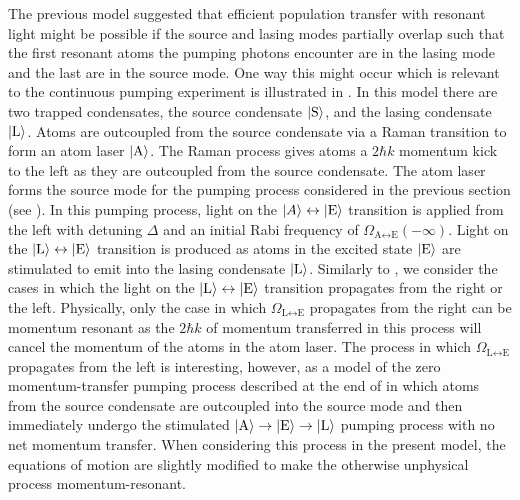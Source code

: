 The previous model suggested that efficient population transfer with resonant light might be possible if the source and lasing modes partially overlap such that the first resonant atoms the pumping photons encounter are in the lasing mode and the last are in the source mode.  One way this might occur which is relevant to the continuous pumping experiment is illustrated in .  In this model there are two trapped condensates, the source condensate ${\left|\text{S}\right>}$, and the lasing condensate ${\left|\text{L}\right>}$.  Atoms are outcoupled from the source condensate via a Raman transition to form an atom laser ${\left|\text{A}\right>}$.  The Raman process gives atoms a $2 \hbar k$ momentum kick to the left as they are outcoupled from the source condensate.  The atom laser forms the source mode for the pumping process considered in the previous section (see ).  In this pumping process, light on the ${\left|A\right>} \leftrightarrow {\ensuremath{\left|\text{E}\right>}}$ transition is applied from the left with detuning $\Delta$ and an initial Rabi frequency of $\Omega_{\text{A}\leftrightarrow\text{E}}(-\infty)$.  Light on the ${\left|\text{L}\right>} \leftrightarrow {\ensuremath{\left|\text{E}\right>}}$ transition is produced as atoms in the excited state ${\left|\text{E}\right>}$ are stimulated to emit into the lasing condensate ${\left|\text{L}\right>}$.  Similarly to , we consider the cases in which the light on the ${\left|\text{L}\right>} \leftrightarrow {\ensuremath{\left|\text{E}\right>}}$ transition propagates from the right or the left.  Physically, only the case in which $\Omega_{\text{L}\leftrightarrow\text{E}}$ propagates from the right can be momentum resonant as the $2 \hbar k$ of momentum transferred in this process will cancel the momentum of the atoms in the atom laser.  The process in which $\Omega_{\text{L}\leftrightarrow\text{E}}$ propagates from the left is interesting, however, as a model of the zero momentum-transfer pumping process described at the end of  in which atoms from the source condensate are outcoupled into the source mode and then immediately undergo the stimulated ${\left|\text{A}\right>} \rightarrow {\ensuremath{\left|\text{E}\right>}} \rightarrow {\ensuremath{\left|\text{L}\right>}}$ pumping process with no net momentum transfer.  When considering this process in the present model, the equations of motion are slightly modified to make the otherwise unphysical process momentum-resonant.

